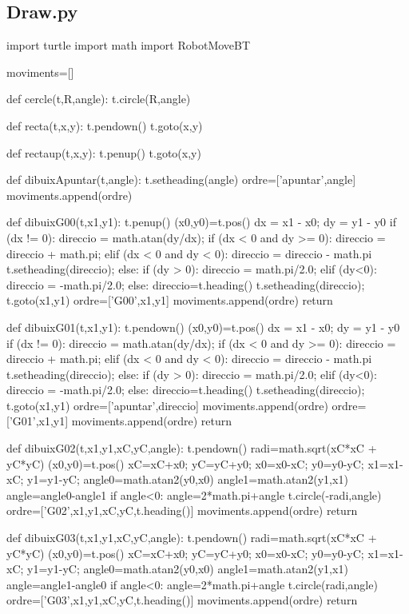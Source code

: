 \newpage

\subsection{Draw.py} \label{PyDraw}
\begin{python}
	import turtle
	import math
	import RobotMoveBT
	
	moviments=[]
	
	def cercle(t,R,angle):
		t.circle(R,angle)
	
	def recta(t,x,y):
		t.pendown()
		t.goto(x,y)
		
	def rectaup(t,x,y):
		t.penup()
		t.goto(x,y)
		
	def dibuixApuntar(t,angle):
		t.setheading(angle)
		ordre=['apuntar',angle]
		moviments.append(ordre)
	
	def dibuixG00(t,x1,y1):
		t.penup()
		(x0,y0)=t.pos()
		dx = x1 - x0;
		dy = y1 - y0
		if (dx != 0):
			direccio = math.atan(dy/dx);
			if (dx < 0 and dy >= 0):
				direccio = direccio + math.pi;
			elif (dx < 0 and dy < 0):
				direccio = direccio - math.pi
			t.setheading(direccio);
		else:
			if (dy > 0):
				direccio = math.pi/2.0;
			elif (dy<0):
				direccio = -math.pi/2.0;
			else:
				direccio=t.heading()
			t.setheading(direccio);
		t.goto(x1,y1)
		ordre=['G00',x1,y1]
		moviments.append(ordre)
		return
	
	def dibuixG01(t,x1,y1):
		t.pendown()
		(x0,y0)=t.pos()
		dx = x1 - x0;
		dy = y1 - y0
		if (dx != 0):
			direccio = math.atan(dy/dx);
			if (dx < 0 and dy >= 0):
				direccio = direccio + math.pi;
			elif (dx < 0 and dy < 0):
				direccio = direccio - math.pi
			t.setheading(direccio);
		else:
			if (dy > 0):
				direccio = math.pi/2.0;
			elif (dy<0):
				direccio = -math.pi/2.0;
			else:
				direccio=t.heading()
			t.setheading(direccio);
		t.goto(x1,y1)
		ordre=['apuntar',direccio]
		moviments.append(ordre)
		ordre=['G01',x1,y1]
		moviments.append(ordre)
		return
	
	
	def dibuixG02(t,x1,y1,xC,yC,angle):
		t.pendown()
		radi=math.sqrt(xC*xC + yC*yC)
		(x0,y0)=t.pos()
		xC=xC+x0;
		yC=yC+y0;
		x0=x0-xC;
		y0=y0-yC;
		x1=x1-xC;
		y1=y1-yC;
		angle0=math.atan2(y0,x0)
		angle1=math.atan2(y1,x1)
		angle=angle0-angle1
		if angle<0:
			angle=2*math.pi+angle
		t.circle(-radi,angle)
		ordre=['G02',x1,y1,xC,yC,t.heading()]
		moviments.append(ordre)
		return
	
	def dibuixG03(t,x1,y1,xC,yC,angle):
		t.pendown()
		radi=math.sqrt(xC*xC + yC*yC)
		(x0,y0)=t.pos()
		xC=xC+x0;
		yC=yC+y0;
		x0=x0-xC;
		y0=y0-yC;
		x1=x1-xC;
		y1=y1-yC;
		angle0=math.atan2(y0,x0)
		angle1=math.atan2(y1,x1)
		angle=angle1-angle0
		if angle<0:
			angle=2*math.pi+angle
		t.circle(radi,angle)
		ordre=['G03',x1,y1,xC,yC,t.heading()]
		moviments.append(ordre)
		return
	

\end{python}
